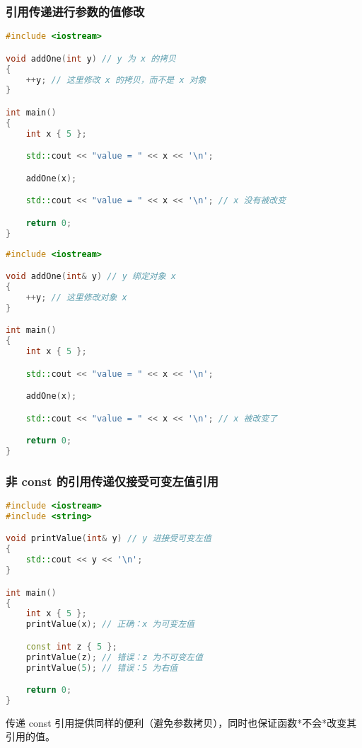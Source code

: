 \documentclass[../../LearnCpp.tex]{subfiles}
\begin{document}
\subsubsection*{引用传递进行参数的值修改}

\begin{lstlisting}[language=C++]
#include <iostream>

void addOne(int y) // y 为 x 的拷贝
{
    ++y; // 这里修改 x 的拷贝，而不是 x 对象
}

int main()
{
    int x { 5 };

    std::cout << "value = " << x << '\n';

    addOne(x);

    std::cout << "value = " << x << '\n'; // x 没有被改变

    return 0;
}
\end{lstlisting}

\begin{lstlisting}[language=C++]
#include <iostream>

void addOne(int& y) // y 绑定对象 x
{
    ++y; // 这里修改对象 x
}

int main()
{
    int x { 5 };

    std::cout << "value = " << x << '\n';

    addOne(x);

    std::cout << "value = " << x << '\n'; // x 被改变了

    return 0;
}
\end{lstlisting}

\subsubsection*{非 const 的引用传递仅接受可变左值引用}

\begin{lstlisting}[language=C++]
#include <iostream>
#include <string>

void printValue(int& y) // y 进接受可变左值
{
    std::cout << y << '\n';
}

int main()
{
    int x { 5 };
    printValue(x); // 正确：x 为可变左值

    const int z { 5 };
    printValue(z); // 错误：z 为不可变左值
    printValue(5); // 错误：5 为右值

    return 0;
}
\end{lstlisting}

传递 const 引用提供同样的便利（避免参数拷贝），同时也保证函数*不会*改变其引用的值。
\end{document}
